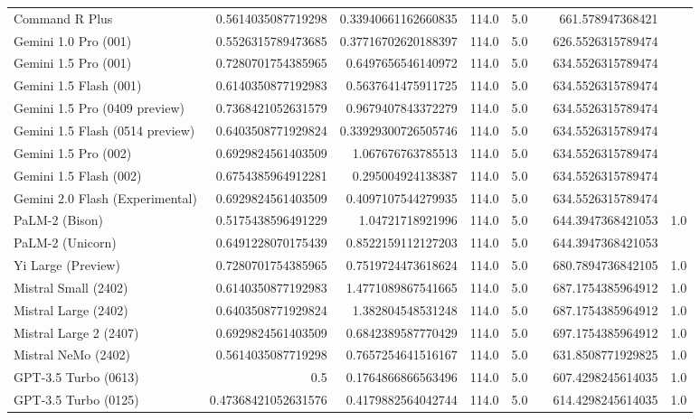 \begin{table}[htp]
{\begin{tabular}{lrrrrrrr}
Command R Plus & 0.5614035087719298 & 0.33940661162660835 & 114.0 & 5.0 &  & 661.578947368421 &  \\
Gemini 1.0 Pro (001) & 0.5526315789473685 & 0.37716702620188397 & 114.0 & 5.0 &  & 626.5526315789474 &  \\
Gemini 1.5 Pro (001) & 0.7280701754385965 & 0.6497656546140972 & 114.0 & 5.0 &  & 634.5526315789474 &  \\
Gemini 1.5 Flash (001) & 0.6140350877192983 & 0.5637641475911725 & 114.0 & 5.0 &  & 634.5526315789474 &  \\
Gemini 1.5 Pro (0409 preview) & 0.7368421052631579 & 0.9679407843372279 & 114.0 & 5.0 &  & 634.5526315789474 &  \\
Gemini 1.5 Flash (0514 preview) & 0.6403508771929824 & 0.33929300726505746 & 114.0 & 5.0 &  & 634.5526315789474 &  \\
Gemini 1.5 Pro (002) & 0.6929824561403509 & 1.067676763785513 & 114.0 & 5.0 &  & 634.5526315789474 &  \\
Gemini 1.5 Flash (002) & 0.6754385964912281 & 0.295004924138387 & 114.0 & 5.0 &  & 634.5526315789474 &  \\
Gemini 2.0 Flash (Experimental) & 0.6929824561403509 & 0.4097107544279935 & 114.0 & 5.0 &  & 634.5526315789474 &  \\
PaLM-2 (Bison) & 0.5175438596491229 & 1.04721718921996 & 114.0 & 5.0 &  & 644.3947368421053 & 1.0 \\
PaLM-2 (Unicorn) & 0.6491228070175439 & 0.8522159112127203 & 114.0 & 5.0 &  & 644.3947368421053 &  \\
Yi Large (Preview) & 0.7280701754385965 & 0.7519724473618624 & 114.0 & 5.0 &  & 680.7894736842105 & 1.0 \\
Mistral Small (2402) & 0.6140350877192983 & 1.4771089867541665 & 114.0 & 5.0 &  & 687.1754385964912 & 1.0 \\
Mistral Large (2402) & 0.6403508771929824 & 1.382804548531248 & 114.0 & 5.0 &  & 687.1754385964912 & 1.0 \\
Mistral Large 2 (2407) & 0.6929824561403509 & 0.6842389587770429 & 114.0 & 5.0 &  & 697.1754385964912 & 1.0 \\
Mistral NeMo (2402) & 0.5614035087719298 & 0.7657254641516167 & 114.0 & 5.0 &  & 631.8508771929825 & 1.0 \\
GPT-3.5 Turbo (0613) & 0.5 & 0.1764866866563496 & 114.0 & 5.0 &  & 607.4298245614035 & 1.0 \\
GPT-3.5 Turbo (0125) & 0.47368421052631576 & 0.4179882564042744 & 114.0 & 5.0 &  & 614.4298245614035 & 1.0 \\

\end{tabular}}
\end{table}
